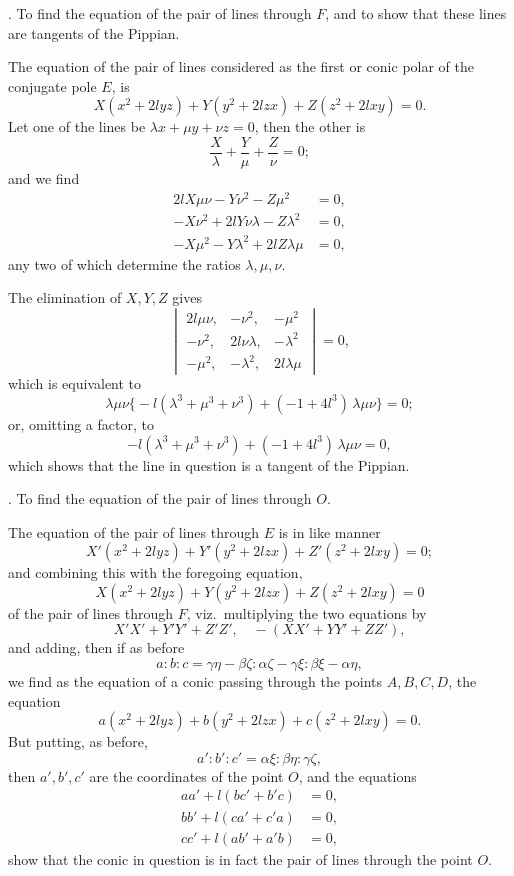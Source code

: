 \documentclass[11pt]{article}
\begin{document}
\medskip

. To find the equation of the pair of lines through $F$, and to show that these lines are tangents of the Pippian.

The equation of the pair of lines considered as the first or conic polar of the conjugate pole $E$, is
\[
X (x^2 + 2 l y z) + Y (y^2 + 2 l z x) + Z (z^2 + 2 l x y) = 0.
\]
Let one of the lines be $\lambda x + \mu y + \nu z = 0$, then the other is
\[
\frac{X}{\lambda} + \frac{Y}{\mu} + \frac{Z}{\nu} = 0;
\]
and we find
\begin{align*}
2 l X \mu \nu - Y \nu^2 - Z \mu^2 &= 0, \\
-X \nu^2 + 2 l Y \nu\lambda - Z \lambda^2 &= 0, \\
-X \mu^2 - Y \lambda^2 + 2 l Z \lambda\mu &= 0,
\end{align*}
any two of which determine the ratios $\lambda, \mu, \nu$.

The elimination of $X, Y, Z$ gives
\[
\begin{vmatrix}
2 l \mu\nu, & -\nu^2, & -\mu^2 \\
-\nu^2, & 2 l \nu\lambda, & -\lambda^2 \\
-\mu^2, & -\lambda^2, & 2 l \lambda\mu
\end{vmatrix} = 0,
\]
which is equivalent to
\[
\lambda\mu\nu \bigl\{-l(\lambda^3 + \mu^3 + \nu^3) + (-1 + 4 l^3)\,\lambda\mu\nu\bigr\} = 0;
\]
or, omitting a factor, to
\[
-l(\lambda^3 + \mu^3 + \nu^3) + (-1 + 4 l^3)\,\lambda\mu\nu = 0,
\]
which shows that the line in question is a tangent of the Pippian.

\medskip

. To find the equation of the pair of lines through $O$.

The equation of the pair of lines through $E$ is in like manner
\[
X' (x^2 + 2 l y z) + Y' (y^2 + 2 l z x) + Z' (z^2 + 2 l x y) = 0;
\]
and combining this with the foregoing equation,
\[
X (x^2 + 2 l y z) + Y (y^2 + 2 l z x) + Z (z^2 + 2 l x y) = 0
\]
of the pair of lines through $F$, viz.\ multiplying the two equations by
\[
X'X' + Y'Y' + Z'Z',\quad -(X X' + Y Y' + Z Z'),
\]
and adding, then if as before
\[
a : b : c = \gamma\eta - \beta\zeta : \alpha\zeta - \gamma\xi : \beta\xi - \alpha\eta,
\]
we find as the equation of a conic passing through the points $A, B, C, D$, the equation
\[
a (x^2 + 2 l y z) + b (y^2 + 2 l z x) + c (z^2 + 2 l x y) = 0.
\]
But putting, as before,
\[
a' : b' : c' = \alpha\xi : \beta\eta : \gamma\zeta,
\]
then $a', b', c'$ are the coordinates of the point $O$, and the equations
\begin{align*}
a a' + l(b c' + b' c) &= 0, \\
b b' + l(c a' + c' a) &= 0, \\
c c' + l(a b' + a' b) &= 0,
\end{align*}
show that the conic in question is in fact the pair of lines through the point $O$.
\end{document}
